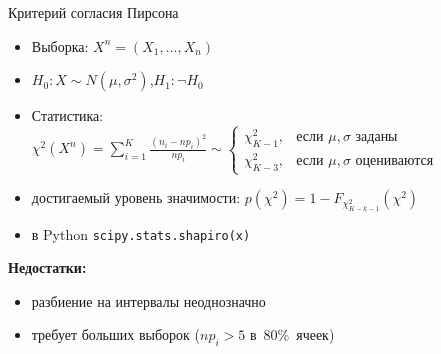 \documentclass[11pt,pdf,utf8,hyperref={unicode},aspectratio=169]{beamer}
\begin{document}
\begin{frame}{Критерий согласия Пирсона}
    \begin{itemize}
    \item Выборка: $X^n=\left(X_1,\ldots,X_n\right)$
    \item $H_0\colon X \sim N\left(\mu,\sigma^2\right)$,\qquad $H_1\colon \lnot H_0$
    \item Статистика: \alert{$\chi^2\left(X^n\right) = \sum_{i=1}^{K}\frac{(n_i-np_i)^2}{np_i}
    \sim \begin{cases}
        \chi^2_{K-1}, & \text{если $\mu,\sigma$ заданы}\\
        \chi^2_{K-3}, & \text{если $\mu,\sigma$ оцениваются}
        \end{cases}
    $}
    \item достигаемый уровень значимости:
    $p\left(\chi^2\right) = 1 - F_{\chi^2_{K-k-1}}\left(\chi^2\right)
    $
    \item  в Python \texttt{scipy.stats.shapiro(x)}
    \end{itemize}

    \bigskip
    \textbf{Недостатки:}
    \begin{itemize}
        \item разбиение на интервалы неоднозначно
        \item требует больших выборок ($np_i>5$ в~80\%~ячеек)
    \end{itemize}
\end{frame}
\end{document}
